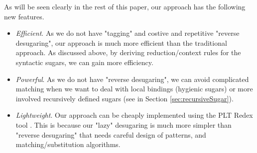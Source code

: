 As will be seen clearly in the rest of this paper, our approach has the following new features.
\begin{itemize}
  \item {\em Efficient}. As we do not have "tagging" and costive and repetitive "reverse desugaring", our approach is much more efficient than the traditional approach. As discussed above, by deriving reduction/context rules for the syntactic sugars, we can gain more efficiency.

  \item {\em Powerful}. As we do not have "reverse desugaring", we can avoid complicated matching when we want to deal with local bindings (hygienic sugars) or more involved recursively defined sugars (see  in Section \ref{sec:recursiveSugar}).

  \item {\em Lightweight}. Our approach can be cheaply implemented using the PLT Redex tool \cite{SEwPR}. This is because our "lazy" desugaring is much more simpler than "reverse desugaring" that needs careful design of patterns, and matching/substitution algorithms.

\end{itemize}
